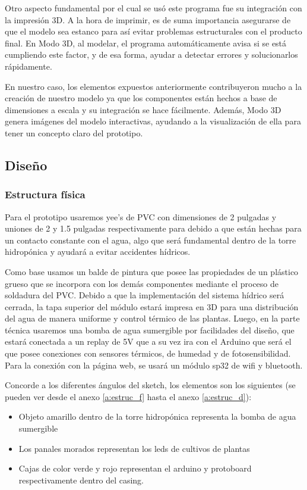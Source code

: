 \begin{itemize}
         Otro aspecto fundamental por el cual se usó este programa fue su
         integración con la impresión 3D. A la hora de imprimir, es de suma
         importancia asegurarse de que el modelo sea estanco para así evitar
         problemas estructurales con el producto final. En Modo 3D, al modelar,
         el programa automáticamente avisa si se está cumpliendo este factor, y
         de esa forma, ayudar a detectar errores y solucionarlos rápidamente.

         En nuestro caso, los elementos expuestos anteriormente contribuyeron
         mucho a la creación de nuestro modelo ya que los componentes están
         hechos a base de dimensiones a escala y su integración se hace
         fácilmente. Además, Modo 3D genera imágenes del modelo interactivas,
         ayudando a la visualización de ella para tener un concepto claro del
         prototipo.
\end{itemize}

\thispagestyle{plain}
\subsection{Diseño}
\label{ssec:diseno}

\subsubsection{Estructura física}

Para el prototipo usaremos yee's de PVC con dimensiones de 2 pulgadas y uniones
de 2 y 1.5 pulgadas respectivamente para debido a que están hechas para un
contacto constante con el agua, algo que será fundamental dentro de la torre
hidropónica y ayudará a evitar accidentes hídricos.

Como base usamos un balde de pintura que posee las propiedades de un plástico
grueso que se incorpora con los demás componentes mediante el proceso de
soldadura del PVC. Debido a que la implementación del sistema hídrico será
cerrada, la tapa superior del módulo estará impresa en 3D para una distribución
del agua de manera uniforme y control térmico de las plantas. Luego, en la
parte técnica usaremos una bomba de agua sumergible por facilidades del diseño,
que estará conectada a un replay de 5V que a su vez ira con el Arduino que será
el que posee conexiones con sensores térmicos, de humedad y de
fotosensibilidad.
Para la conexión con la página  web, se usará un módulo sp32 de wifi y bluetooth.

Concorde a los diferentes ángulos del sketch, los elementos son los siguientes (se pueden ver desde el anexo \ref{a:estruc_f} hasta el anexo \ref{a:estruc_d}):
\begin{itemize}
    \item Objeto amarillo dentro de la torre hidropónica representa la bomba de agua sumergible
    \item Los panales morados representan los leds de cultivos de plantas
    \item Cajas de color verde y rojo representan el arduino y protoboard respectivamente dentro del casing.
\end{itemize}

